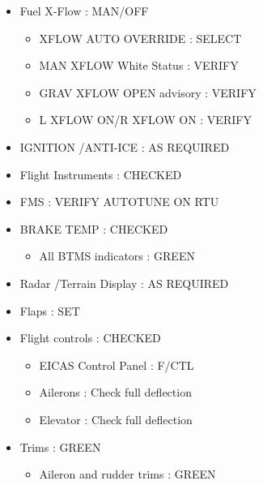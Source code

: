 \begin{itemize}
\item Fuel X-Flow : MAN\slash OFF

\begin{itemize}
\item XFLOW AUTO OVERRIDE : SELECT

\item MAN XFLOW White Status : VERIFY

\item GRAV XFLOW OPEN advisory : VERIFY

\item L XFLOW ON\slash R XFLOW ON : VERIFY

\end{itemize}

\item IGNITION \slash  ANTI-ICE : AS REQUIRED

\item Flight Instruments : CHECKED

\item FMS : VERIFY AUTOTUNE ON RTU

\item BRAKE TEMP : CHECKED

\begin{itemize}
\item All BTMS indicators : GREEN

\end{itemize}

\item Radar \slash  Terrain Display : AS REQUIRED

\item Flaps : SET

\item Flight controls : CHECKED

\begin{itemize}
\item EICAS Control Panel : F\slash CTL

\item Ailerons : Check full deflection

\item Elevator : Check full deflection

\end{itemize}

\item Trims : GREEN

\begin{itemize}
\item Aileron and rudder trims : GREEN


\end{itemize}
\end{itemize}
